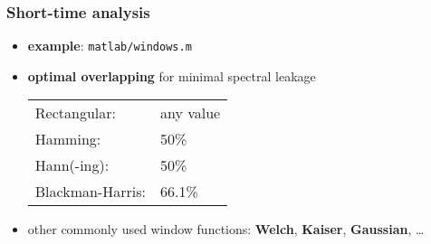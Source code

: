 \begin{frame} %
	\frametitle{Short-time analysis}
	\begin{itemize}
		\item \textbf{example}: \texttt{matlab/windows.m}
			\begin{figure}
				\centering
				\begin{subfigure}[c]{0.7\linewidth}
				\end{subfigure}
			\end{figure}
		\item \textbf{optimal overlapping} for minimal spectral leakage
			\begin{table}
				\hspace{-3em}
				\small
				\begin{tabular}{ll}
					Rectangular:&any value\\
					Hamming:&50\%\\
					Hann(-ing):&50\%\\
					Blackman-Harris:&66.1\%
				\end{tabular}
			\end{table}
		\item other commonly used window functions: \textbf{Welch}, \textbf{Kaiser}, \textbf{Gaussian}, \ldots
	\end{itemize}
\end{frame}

